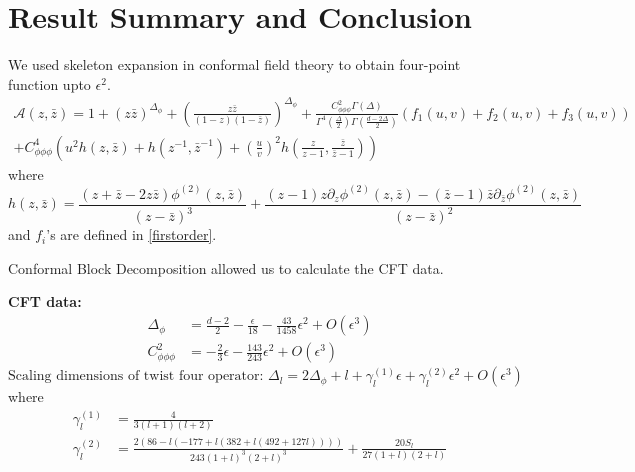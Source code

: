 \documentclass[12pt,a4paper,oneside]{book}
\theoremstyle{definition}
\begin{document}
        \chapter{Result Summary and Conclusion}
            We used skeleton expansion in conformal field theory to obtain four-point function upto $\epsilon^2$.
            \begin{multline}
                \mathcal{A}(z,\bar{z}) = 1+(z\bar{z})^{\Delta_{\phi}} + \left(\frac{z\bar{z}}{(1-z)(1-\bar{z})} \right)^{\Delta_{\phi}} + \frac{C_{\phi\phi\phi}^{2}\Gamma(\Delta)}{\Gamma^{4}(\frac{\Delta}{2})\Gamma(\frac{d-2\Delta}{2})}\left(f_1(u,v)+f_2(u,v)+f_3(u,v) \right)\\ + C_{\phi\phi\phi}^4\left(u^2h(z,\bar{z}) + h(z^{-1},\bar{z}^{-1}) + \left(\frac{u}{v}\right)^2h\left(\frac{z}{z-1},\frac{\bar{z}}{\bar{z}-1} \right) \right)
            \end{multline}
            where 
            \begin{equation}
                h(z,\bar{z}) = \frac{(z+\bar{z}-2z\bar{z})\phi^{(2)}(z,\bar{z})}{(z-\bar{z})^3} + \frac{(z-1)z\partial_{z}\phi^{(2)}(z,\bar{z}) - (\bar{z}-1)\bar{z}\partial_{\bar{z}}\phi^{(2)}(z,\bar{z})}{(z-\bar{z})^2}
            \end{equation}
            and  $f_i$'s are defined in \ref{firstorder}.\par
            Conformal Block Decomposition allowed us to calculate the CFT data.\par
            \textbf{CFT data:}
            \begin{align}
                \Delta_{\phi} &= \frac{d-2}{2} - \frac{\epsilon}{18} - \frac{43}{1458}\epsilon^2 + O(\epsilon^3)\\
                C_{\phi\phi\phi}^2 &= -\frac{2}{3}\epsilon - \frac{143}{243}\epsilon^2 + O(\epsilon^3)
            \end{align}
            \begin{equation*}
                \text{Scaling dimensions of twist four operator: }\Delta_l = 2\Delta_{\phi} + l + \gamma_l^{(1)}\epsilon + \gamma_l^{(2)}\epsilon^2 + O(\epsilon^3)
            \end{equation*}
            where
            \begin{align}
                \gamma_l^{(1)} &= \frac{4}{3(l+1)(l+2)}\\
                \gamma_l^{(2)} &= \frac{2(86-l(-177+l(382+l(492+127l))))}{243(1+l)^3(2+l)^3} + \frac{20S_l}{27(1+l)(2+l)}
            \end{align}
\end{document}
